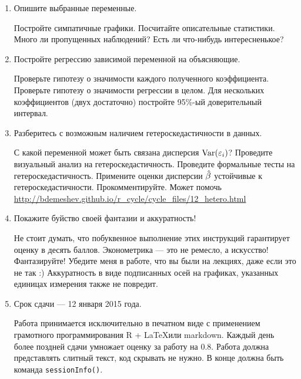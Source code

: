 \documentclass[12pt, a4paper]{article}\usepackage[]{graphicx}\usepackage[]{color}
\begin{document}
\begin{enumerate}
\item Опишите выбранные переменные.

Постройте симпатичные графики. Посчитайте описательные статистики. Много ли пропущенных наблюдений? Есть ли что-нибудь интересненькое?

\item Постройте регрессию зависимой переменной на объясняющие.

Проверьте гипотезу о значимости каждого полученного коэффициента. Проверьте гипотезу о значимости регрессии в целом. Для нескольких коэффициентов (двух достаточно) постройте 95\%-ый доверительный интервал.

\item Разберитесь с возможным наличием гетероскедастичности в данных.

С какой переменной может быть связана дисперсия $\operatorname{Var}(\varepsilon_i)$? Проведите визуальный анализ на гетероскедастичность. Проведите формальные тесты на гетероскедастичность. Примените оценки дисперсии $\hat{\beta}$ устойчивые к гетероскедастичности. Прокомментируйте. Может помочь \url{http://bdemeshev.github.io/r_cycle/cycle_files/12_hetero.html}

\item Покажите буйство своей фантазии и аккуратность!

Не стоит думать, что побуквенное выполнение этих инструкций гарантирует оценку в десять баллов. Эконометрика — это не ремесло, а искусство! Фантазируйте! Убедите меня в работе, что вы были на лекциях, даже если это не так :) Аккуратность в виде подписанных осей на графиках, указанных единицах измерения также не повредит.

\item Срок сдачи — 12 января 2015 года.

Работа принимается исключительно в печатном виде с применением грамотного программирования R + \LaTeX или markdown. Каждый день более поздней сдачи умножает оценку за работу на $0.8$.  Работа должна представлять слитный текст, код скрывать не нужно. В конце должна быть команда \verb|sessionInfo()|.





\end{enumerate}
\end{document}
